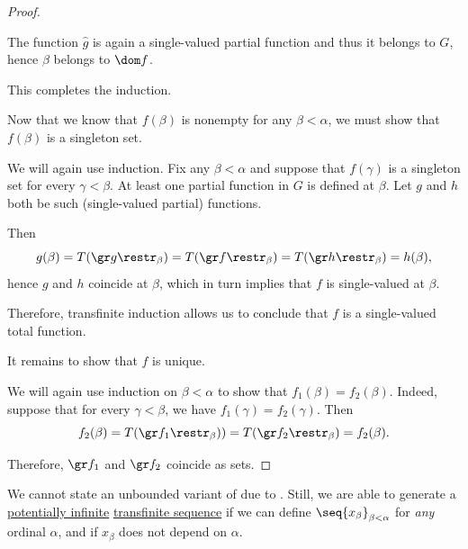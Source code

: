 \begin{proof}
\begin{itemize}
    The function \( \widehat g \) is again a single-valued partial function and thus it belongs to \( G \), hence \( \beta \) belongs to \( \dom f \).
  \end{itemize}

  This completes the induction.

   Now that we know that \( f(\beta) \) is nonempty for any \( \beta < \alpha \), we must show that \( f(\beta) \) is a singleton set.

  We will again use induction. Fix any \( \beta < \alpha \) and suppose that \( f(\gamma) \) is a singleton set for every \( \gamma < \beta \). At least one partial function in \( G \) is defined at \( \beta \). Let \( g \) and \( h \) both be such (single-valued partial) functions.

  Then
  \begin{equation*}
    g(\beta) = T(\gr g\restr_\beta) = T(\gr f\restr_\beta) = T(\gr h\restr_\beta) = h(\beta),
  \end{equation*}
  hence \( g \) and \( h \) coincide at \( \beta \), which in turn implies that \( f \) is single-valued at \( \beta \).

  Therefore, transfinite induction allows us to conclude that \( f \) is a single-valued total function.

   It remains to show that \( f \) is unique.

  We will again use induction on \( \beta < \alpha \) to show that \( f_1(\beta) = f_2(\beta) \). Indeed, suppose that for every \( \gamma < \beta \), we have \( f_1(\gamma) = f_2(\gamma) \). Then
  \begin{equation*}
    f_2(\beta) = T(\gr f_1\restr_\beta)) = T(\gr f_2\restr_\beta) = f_2(\beta).
  \end{equation*}

  Therefore, \( \gr f_1 \) and \( \gr f_2 \) coincide as sets.
\end{proof}

\begin{remark}\label{rem:unbounded_transfinite_recursion}
  We cannot state an unbounded variant of  due to . Still, we are able to generate a \hyperref[con:transfinitum]{potentially infinite} \hyperref[def:transfinite_sequence]{transfinite sequence} if we can define \( \seq{ x_\beta }_{\beta < \alpha} \) for \emph{any} ordinal \( \alpha \), and if \( x_\beta \) does not depend on \( \alpha \).
\end{remark}

